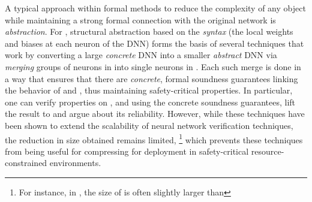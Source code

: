 
A typical approach within formal methods to reduce the complexity of any object
while maintaining a strong formal connection with the original network is
\emph{abstraction}.
For \dnn, structural abstraction based on the \emph{syntax} (the local weights
and biases at each neuron of the DNN) forms the basis of several techniques
\cite{cegar-nn,cegarette,cleverest-nn,conv-abs-gk} 
that work by converting a large \emph{concrete}
DNN \cnc into a smaller \emph{abstract} DNN \abs via \emph{merging} groups
of neurons in \cnc into single neurons in \abs. 
Each such merge is done in a
way that ensures that there are \textit{concrete}, formal soundness guarantees
linking the behavior of \cnc and \abs, thus maintaining safety-critical
properties. 
In particular, one can verify properties on \abs, and
using the concrete soundness guarantees, lift the result to \cnc and argue
about its reliability. 
However, while these techniques have been shown to extend the scalability of
neural network verification techniques, the
reduction in size obtained remains limited, \footnote{For instance, in
\cite{cegar-nn}, the size of \abs is often slightly larger than \cnc
{}} which prevents these techniques from being
useful for compressing \dnn for deployment in safety-critical
resource-constrained environments.

